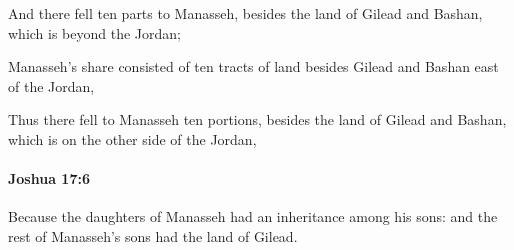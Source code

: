 			\begin{versebox}
					\item[BHS] 
					\item[ASV] And there fell ten parts to Manasseh, besides the land of Gilead and Bashan, which is beyond the Jordan;
					\item[NIV] Manasseh’s share consisted of ten tracts of land besides Gilead and Bashan east of the Jordan,
					\item[NRSV] Thus there fell to Manasseh ten portions, besides the land of Gilead and Bashan, which is on the other side of the Jordan,
			\end{versebox}

		\paragraph{Joshua 17:6} %
			\label{JOSHUA-17-6}

			Because the daughters of Manasseh had an inheritance among his sons: and the rest of Manasseh’s sons had the land of Gilead.

